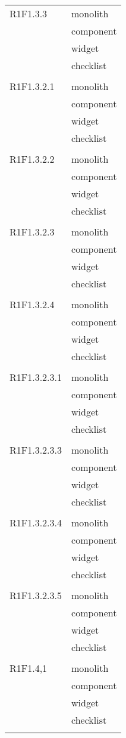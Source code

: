 \begin{center}
\begin{longtable}{|p{7cm}|p{7cm}|}
		R1F1.3.3 & monolith \\ & component \\ & widget \\ & checklist \\ & \\ \hline
		R1F1.3.2.1 & monolith \\ & component \\ & widget \\ & checklist \\ & \\ \hline
		R1F1.3.2.2 & monolith \\ & component \\ & widget \\ & checklist \\ & \\ \hline
		R1F1.3.2.3 & monolith \\ & component \\ & widget \\ & checklist \\ & \\ \hline
		R1F1.3.2.4 & monolith \\ & component \\ & widget \\ & checklist \\ & \\ \hline
		R1F1.3.2.3.1 & monolith \\ & component \\ & widget \\ & checklist \\ & \\ \hline
		R1F1.3.2.3.3 & monolith \\ & component \\ & widget \\ & checklist \\ & \\ \hline
		R1F1.3.2.3.4 & monolith \\ & component \\ & widget \\ & checklist \\ & \\ \hline
		R1F1.3.2.3.5 & monolith \\ & component \\ & widget \\ & checklist \\ & \\ \hline
		R1F1.4,1 & monolith \\ & component \\ & widget \\ & checklist \\ & \\ \hline

\end{longtable}
\end{center}
